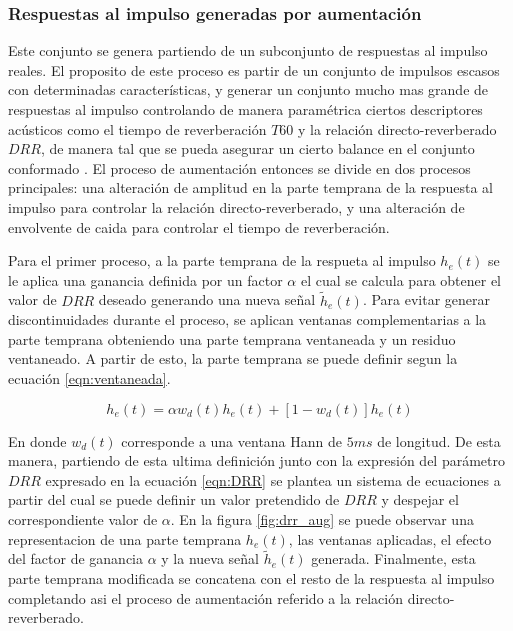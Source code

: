 \subsubsection{Respuestas al impulso generadas por aumentación}
Este conjunto se genera partiendo de un subconjunto de respuestas al impulso reales. El proposito de este proceso es partir de un conjunto de impulsos escasos con determinadas características, y generar un conjunto mucho mas grande de respuestas al impulso controlando de manera paramétrica ciertos descriptores acústicos como el tiempo de reverberación $T60$ y la relación directo-reverberado $DRR$, de manera tal que se pueda asegurar un cierto balance en el conjunto conformado \cite{rir_aug}. El proceso de aumentación entonces se divide en dos procesos principales: una alteración de amplitud en la parte temprana de la respuesta al impulso para controlar la relación directo-reverberado, y una alteración de envolvente de caida para controlar el tiempo de reverberación.

Para el primer proceso, a la parte temprana de la respueta al impulso $h_{e}(t)$ se le aplica una ganancia definida por un factor $\alpha$ el cual se calcula para obtener el valor de $DRR$ deseado generando una nueva señal $\tilde{h}_{e}(t)$. Para evitar generar discontinuidades durante el proceso, se aplican ventanas complementarias a la parte temprana obteniendo una parte temprana ventaneada y un residuo ventaneado. A partir de esto, la parte temprana se puede definir segun la ecuación
\ref{eqn:ventaneada}.  

\begin{equation}
\label{eqn:ventaneada}
	h_{e}(t) = \alpha w_{d}(t)h_{e}(t) + [1-w_{d}(t)]h_{e}(t)
\end{equation} 

En donde $w_{d}(t)$ corresponde a una ventana Hann de $5 ms$ de longitud. De esta manera, partiendo de esta ultima definición junto con la expresión del parámetro $DRR$ expresado en la ecuación \ref{eqn:DRR} se plantea un sistema de ecuaciones a partir del cual se puede definir un valor pretendido de $DRR$ y despejar el correspondiente valor de $\alpha$. En la figura \ref{fig:drr_aug} se puede observar una representacion de una parte temprana $h_{e}(t)$, las ventanas aplicadas, el efecto del factor de ganancia $\alpha$ y la nueva señal $\tilde{h}_{e}(t)$ generada. Finalmente, esta parte temprana modificada se concatena con el resto de la respuesta al impulso completando asi el proceso de aumentación referido a la relación directo-reverberado.


